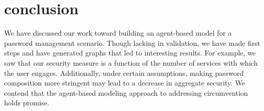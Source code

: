 \documentclass[conference]{IEEEtran}
\begin{document}
{\section{conclusion}
\label{conclusion}

We have discussed our work toward building an agent-based model 
for a password management scenario. Though lacking in validation, 
we have made first steps and have generated graphs that led to 
interesting results. For example, we saw that our security measure 
is a function of the number of services with which the user engages. 
Additionally, under certain assumptions, making password composition 
more stringent may lead to a decrease in aggregate security. We contend 
that the agent-based modeling approach to addressing circumvention 
holds promise.

%
%



%
%


}
\end{document}
